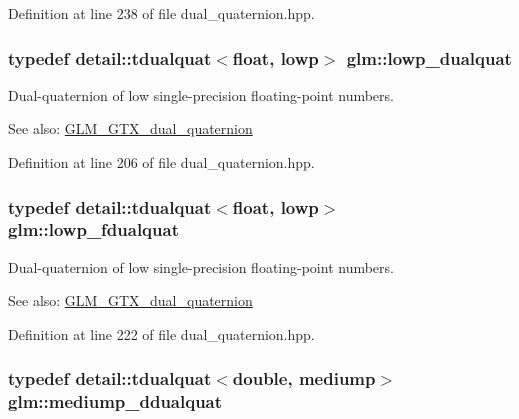 Definition at line 238 of file dual\_\-quaternion.hpp.\hypertarget{group__gtc__dual__quaternion_ge1772179edc60f4e8b46c8772eeeccee}{
\subsubsection[lowp\_\-dualquat]{\setlength{\rightskip}{0pt plus 5cm}typedef detail::tdualquat$<$float, lowp$>$ {\bf glm::lowp\_\-dualquat}}}
\label{group__gtc__dual__quaternion_ge1772179edc60f4e8b46c8772eeeccee}


Dual-quaternion of low single-precision floating-point numbers.

\begin{Desc}
\item[See also:]\hyperlink{group__gtc__dual__quaternion}{GLM\_\-GTX\_\-dual\_\-quaternion} \end{Desc}


Definition at line 206 of file dual\_\-quaternion.hpp.\hypertarget{group__gtc__dual__quaternion_ge62c636c63c9eb3c1ea6d10f4b7d7c81}{
\subsubsection[lowp\_\-fdualquat]{\setlength{\rightskip}{0pt plus 5cm}typedef detail::tdualquat$<$float, lowp$>$ {\bf glm::lowp\_\-fdualquat}}}
\label{group__gtc__dual__quaternion_ge62c636c63c9eb3c1ea6d10f4b7d7c81}


Dual-quaternion of low single-precision floating-point numbers.

\begin{Desc}
\item[See also:]\hyperlink{group__gtc__dual__quaternion}{GLM\_\-GTX\_\-dual\_\-quaternion} \end{Desc}


Definition at line 222 of file dual\_\-quaternion.hpp.\hypertarget{group__gtc__dual__quaternion_g62d8cbf30e2afd0b1044204268a69066}{
\subsubsection[mediump\_\-ddualquat]{\setlength{\rightskip}{0pt plus 5cm}typedef detail::tdualquat$<$double, mediump$>$ {\bf glm::mediump\_\-ddualquat}}}
\label{group__gtc__dual__quaternion_g62d8cbf30e2afd0b1044204268a69066}


